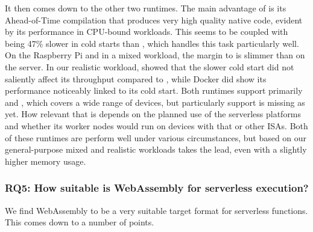 It then comes down to the other two runtimes. The main advantage of  is its Ahead-of-Time compilation that produces very high quality native code, evident by its performance in CPU-bound workloads. This seems to be coupled with being 47\% slower in cold starts than , which handles this task particularly well. On the Raspberry 
Pi and in a mixed workload, the margin to  is slimmer than on the server.
In our realistic workload,  showed that the slower cold start did not saliently affect its throughput compared to , while Docker did show its performance noticeably linked to its cold start.
Both runtimes support primarily  and , which covers a wide range of devices, but particularly  support is missing as yet. How relevant that is depends on the planned use of the serverless platforms and whether its worker nodes would run on devices with that or other ISAs.
Both of these runtimes are perform well under various circumstances, but based on our general-purpose mixed and realistic workloads  takes the lead, even with a slightly higher memory usage.



\subsubsection*{RQ5: How suitable is WebAssembly for serverless execution?}

We find WebAssembly to be a very suitable target format for serverless functions. This comes down to a number of points.

